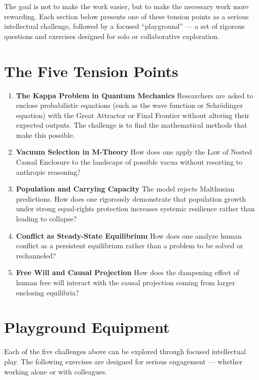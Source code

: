 The goal is not to make the work easier, but to make the necessary work more rewarding. Each section below presents one of these tension points as a serious intellectual challenge, followed by a focused “playground” — a set of rigorous questions and exercises designed for solo or collaborative exploration.

\section{The Five Tension Points}

\begin{enumerate}
    \item \textbf{The Kappa Problem in Quantum Mechanics}  
    Researchers are asked to enclose probabilistic equations (such as the wave function or Schrödinger equation) with the Great Attractor or Final Frontier without altering their expected outputs. The challenge is to find the mathematical methods that make this possible.

    \item \textbf{Vacuum Selection in M-Theory}  
    How does one apply the Law of Nested Causal Enclosure to the landscape of possible vacua without resorting to anthropic reasoning?

    \item \textbf{Population and Carrying Capacity}  
    The model rejects Malthusian predictions. How does one rigorously demonstrate that population growth under strong equal-rights protection increases systemic resilience rather than leading to collapse?

    \item \textbf{Conflict as Steady-State Equilibrium}  
    How does one analyze human conflict as a persistent equilibrium rather than a problem to be solved or rechanneled?

    \item \textbf{Free Will and Causal Projection}  
    How does the dampening effect of human free will interact with the causal projection coming from larger enclosing equilibria?
\end{enumerate}

\section{Playground Equipment}

Each of the five challenges above can be explored through focused intellectual play. The following exercises are designed for serious engagement — whether working alone or with colleagues.

